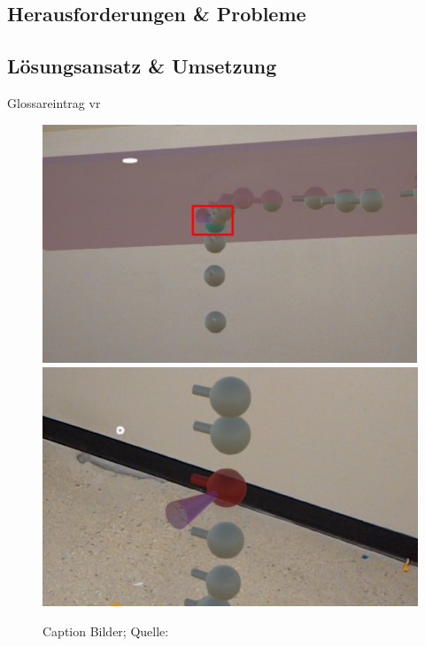 \subsection{Herausforderungen \& Probleme}

\subsection{Lösungsansatz \& Umsetzung}

Glossareintrag \gls{vr}
\begin{figure}[H]
    \centering
    \includegraphics[scale=0.35]{Grafiken/beispielGrafiken/bild_1.PNG}
    \includegraphics[scale=0.35]{Grafiken/beispielGrafiken/bild_2.PNG}
    \caption{Caption Bilder; Quelle: \cite{trajektorienDemonstration}}
    \label{fig:bild_label}
\end{figure}

